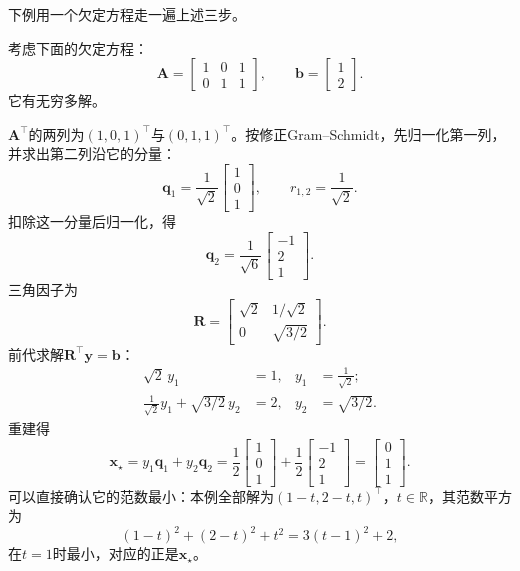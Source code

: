 下例用一个欠定方程走一遍上述三步。

\begin{example}[转置QR给出最小范数解]
\label{ex:ls-qr-min-norm-run}
考虑下面的欠定方程：
\[
 \bm A=\begin{bmatrix}1&0&1\\0&1&1\end{bmatrix},\qquad
 \bm b=\begin{bmatrix}1\\2\end{bmatrix}.
\]
它有无穷多解。

$\bm A^\top$的两列为$(1,0,1)^\top$与$(0,1,1)^\top$。按修正Gram--Schmidt，先归一化第一列，并求出第二列沿它的分量：
\[
 \bm q_1=\frac1{\sqrt2}\begin{bmatrix}1\\0\\1\end{bmatrix},\qquad
 r_{1,2}=\frac1{\sqrt2}.
\]
扣除这一分量后归一化，得
\[
 \bm q_2=\frac1{\sqrt6}\begin{bmatrix}-1\\2\\1\end{bmatrix}.
\]
三角因子为
\[
 \bm R=\begin{bmatrix}\sqrt2&1/\sqrt2\\0&\sqrt{3/2}\end{bmatrix}.
\]
前代求解$\bm R^\top\bm y=\bm b$：
\[
 \begin{aligned}
 \sqrt2\,y_1&=1, & y_1&=\tfrac1{\sqrt2};\\
 \tfrac1{\sqrt2}y_1+\sqrt{3/2}\,y_2&=2, & y_2&=\sqrt{3/2} .
 \end{aligned}
\]
重建得
\[
 \bm x_\star=y_1\bm q_1+y_2\bm q_2
 =\frac12\begin{bmatrix}1\\0\\1\end{bmatrix}+\frac12\begin{bmatrix}-1\\2\\1\end{bmatrix}
 =\begin{bmatrix}0\\1\\1\end{bmatrix}.
\]
可以直接确认它的范数最小：本例全部解为$(1-t,2-t,t)^\top$，$t\in\mathbb R$，其范数平方为
\[
 (1-t)^2+(2-t)^2+t^2=3(t-1)^2+2 ,
\]
在$t=1$时最小，对应的正是$\bm x_\star$。
\end{example}

